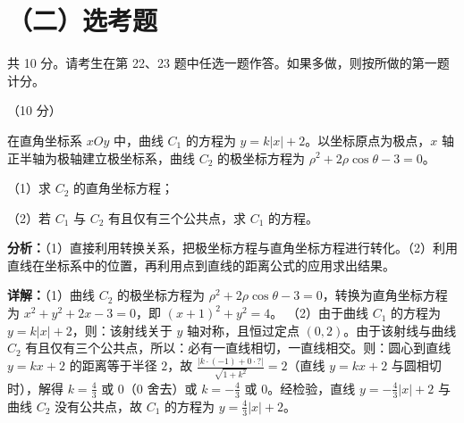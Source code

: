 \section*{（二）选考题}
共 10 分。请考生在第 22、23 题中任选一题作答。如果多做，则按所做的第一题计分。

\begin{question}[points=10]
[选修 4-4：坐标系与参数方程]（10 分）

在直角坐标系 $xOy$ 中，曲线 $C_1$ 的方程为 $y=k|x|+2$。以坐标原点为极点，$x$ 轴正半轴为极轴建立极坐标系，曲线 $C_2$ 的极坐标方程为 $\rho^2+2\rho\cos\theta-3=0$。

（1）求 $C_2$ 的直角坐标方程；

（2）若 $C_1$ 与 $C_2$ 有且仅有三个公共点，求 $C_1$ 的方程。
\begin{solution}

\textbf{分析：}（1）直接利用转换关系，把极坐标方程与直角坐标方程进行转化。（2）利用直线在坐标系中的位置，再利用点到直线的距离公式的应用求出结果。

\textbf{详解：}（1）曲线 $C_2$ 的极坐标方程为 $\rho^2+2\rho\cos\theta-3=0$，转换为直角坐标方程为 $x^2+y^2+2x-3=0$，即 $(x+1)^2+y^2=4$。
（2）由于曲线 $C_1$ 的方程为 $y=k|x|+2$，则：该射线关于 $y$ 轴对称，且恒过定点 $(0,2)$。由于该射线与曲线 $C_2$ 有且仅有三个公共点，所以：必有一直线相切，一直线相交。则：圆心到直线 $y=kx+2$ 的距离等于半径 $2$，故 $\frac{|k\cdot(-1)+0\cdot?|}{\sqrt{1+k^2}}=2$（直线 $y=kx+2$ 与圆相切时），解得 $k=\frac{4}{3}$ 或 $0$（$0$ 舍去）或 $k=-\frac{4}{3}$ 或 $0$。经检验，直线 $y=-\frac{4}{3}|x|+2$ 与曲线 $C_2$ 没有公共点，故 $C_1$ 的方程为 $y=\frac{4}{3}|x|+2$。
\end{solution}
\end{question}

